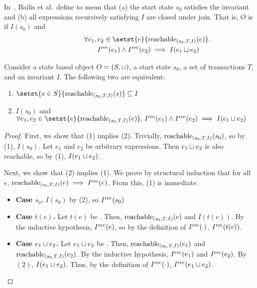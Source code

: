 In~\cite{bailis2014coordination}, Bailis et al.\ define \sTIconfluence{} to
mean that (a) the start state $s_0$ satisfies the invariant and (b) all
\sTIreachable{} expressions recursively satisfying $I$ are closed under join.
That is, $O$ is \sTIconfluent{} if $I(s_0)$ and
\begin{gather*}
  \hspace{0.75in} \forall e_1, e_2 \in \setst{e}{\sTIreachablepredicate{e}}.\; \\
  \hspace{0.75in} \Irec{e_1} \land \Irec{e_2} \implies I(e_1 \join e_2)
\end{gather*}

\begin{theorem}
  Consider a state based object $O = (S, \sqcup)$, a start state $s_0$, a set of
  transactions $T$, and an invariant $I$. The following two are equivalent:
  \begin{enumerate}
    \item
      $\setst{s \in S}{\sTIreachablepredicate{s}} \subseteq I$

    \item
      $I(s_0)$ and
      $\forall e_1, e_2 \in \setst{e}{\sTIreachablepredicate{e}}.\;
         \Irec{e_1} \land \Irec{e_2} \implies I(e_1 \join e_2)$
  \end{enumerate}
\end{theorem}
\begin{proof}
  First, we show that (1) implies (2). Trivially,
  $\text{reachable}_{(s_0, T, I)}(s_0)$, so by (1), $I(s_0)$. Let $e_1$ and $e_2$ be
  arbitrary \sTIreachable{} expressions. Then $e_1 \sqcup e_2$ is also
  reachable, so by (1), $I(e_1 \sqcup e_2)$.

  Next, we show that (2) implies (1). We prove by structural induction that for
  all $e$, $\text{reachable}_{(s_0, T, I)}(e) \implies I^{\text{rec}}(e)$. From this, (1) is
  immediate.
  \begin{itemize}
    \item \textbf{Case $s_0$.}
      $I(s_0)$ by (2), so $I^{\text{rec}}(s_0)$

    \item \textbf{Case $t(e)$.}
      Let $t(e)$ be \sTIreachable{}. Then, $\text{reachable}_{(s_0, T, I)}(e)$ and
      $I(t(e))$. By the inductive hypothesis, $I^{\text{rec}}(e)$, so by the definition
      of $I^{\text{rec}}(\cdot)$, $I^{\text{rec}}(t(e))$.

    \item \textbf{Case $e_1 \sqcup e_2$.}
      Let $e_1 \sqcup e_2$ be \sTIreachable{}. Then,
      $\text{reachable}_{(s_0, T, I)}(e_1)$ and $\text{reachable}_{(s_0, T, I)}(e_2)$. By the
      inductive hypothesis, $I^{\text{rec}}(e_1)$ and $I^{\text{rec}}(e_2)$. By $(2)$, $I(e_1
      \sqcup e_2)$. Thus, by the definition of $I^{\text{rec}}(\cdot)$, $I^{\text{rec}}(e_1 \sqcup
      e_2)$.
  \end{itemize}
\end{proof}
